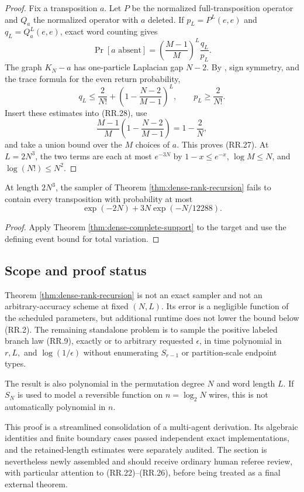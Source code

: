 \begin{proof}
Fix a transposition $a$.  Let $P$ be the normalized full-transposition
operator and $Q_a$ the normalized operator with $a$ deleted.  If
$p_L=P^L(e,e)$ and $q_L=Q_a^L(e,e)$, exact word counting gives
\[
  \Pr[a\text{ absent}]
  =
  \left(\frac{M-1}{M}\right)^L\frac{q_L}{p_L}.
  \tag{RR.28}
\]
The graph $K_N-a$ has one-particle Laplacian gap $N-2$.  By
\cite[Theorem 1.1]{CLR2010}, sign symmetry, and the trace formula for the
even return probability,
\[
  q_L\le\frac2{N!}
  +
  \left(1-\frac{N-2}{M-1}\right)^L,
  \qquad
  p_L\ge\frac2{N!}.
\]
Insert these estimates into (RR.28), use
\[
  \frac{M-1}{M}
  \left(1-\frac{N-2}{M-1}\right)
  =1-\frac2N,
\]
and take a union bound over the $M$ choices of $a$.  This proves (RR.27).
At $L=2N^3$, the two terms are each at most $e^{-3N}$ by
$1-x\le e^{-x}$, $\log M\le N$, and $\log(N!)\le N^2$.
\end{proof}

\begin{corollary}
At length $2N^3$, the sampler of Theorem
\ref{thm:dense-rank-recursion} fails to contain every transposition with
probability at most
\[
  \exp(-2N)+3N\exp(-N/12288).
\]
\end{corollary}

\begin{proof}
Apply Theorem \ref{thm:dense-complete-support} to the target and use the
defining event bound for total variation.
\end{proof}

\subsection{Scope and proof status}

Theorem \ref{thm:dense-rank-recursion} is not an exact sampler and not an
arbitrary-accuracy scheme at fixed $(N,L)$.  Its error is a negligible
function of the scheduled parameters, but additional runtime does not lower
the bound below (RR.2).  The remaining standalone problem is to sample the
positive labeled branch law (RR.9), exactly or to arbitrary requested
$\epsilon$, in time polynomial in $r,L,$ and $\log(1/\epsilon)$ without
enumerating $S_{r-1}$ or partition-scale endpoint types.

The result is also polynomial in the permutation degree $N$ and word length
$L$.  If $S_N$ is used to model a reversible function on $n=\log_2N$ wires,
this is not automatically polynomial in $n$.

This proof is a streamlined consolidation of a multi-agent derivation.  Its
algebraic identities and finite boundary cases passed independent exact
implementations, and the retained-length estimates were separately audited.
The section is nevertheless newly assembled and should receive ordinary
human referee review, with particular attention to (RR.22)--(RR.26), before
being treated as a final external theorem.
